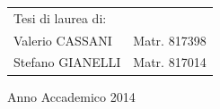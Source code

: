 \begin{titlepage}
\begin{flushright}
\begin{tabular}{ll}
Tesi di laurea di: & \tabularnewline
Valerio CASSANI & Matr. 817398\tabularnewline
Stefano GIANELLI & Matr. 817014\tabularnewline
\end{tabular}\vspace{2.2cm}

\par\end{flushright}

\begin{center}
{\large{}Anno Accademico 2014}
\par\end{center}{\large \par}

\end{titlepage}
